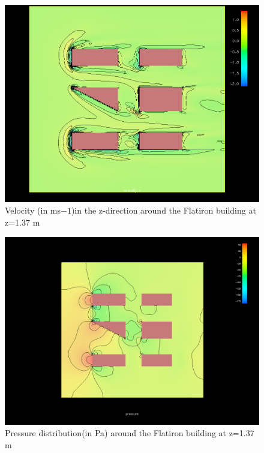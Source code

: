 \begin{figure}[h!]
\centering
\includegraphics[width = \textwidth]{zvelocity.png}
\caption{Velocity (in ms${-1}$)in the z-direction around the Flatiron building at z=1.37 m}
\label{fig:zvelocity}
\end{figure}
\begin{figure}[h!]
\centering
\includegraphics[width = \textwidth]{zpressure.png}
\caption{Pressure distribution(in Pa) around the Flatiron building at z=1.37 m}
\label{fig:zpressure}
\end{figure}
